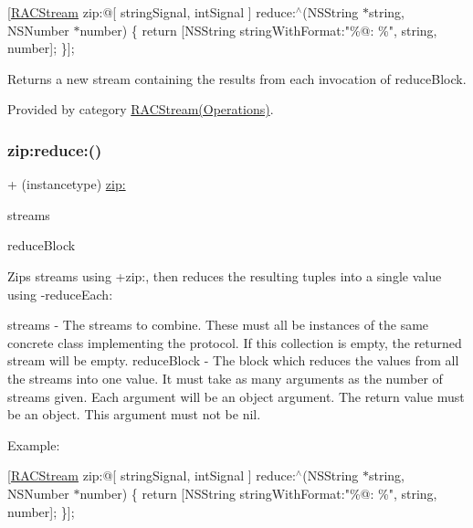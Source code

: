 \mbox{[}\mbox{\hyperlink{interface_r_a_c_stream}{R\+A\+C\+Stream}} zip\+:@\mbox{[} string\+Signal, int\+Signal \mbox{]} reduce\+:$^\wedge$(N\+S\+String $\ast$string, N\+S\+Number $\ast$number) \{ return \mbox{[}N\+S\+String string\+With\+Format\+:"\%@\+: \%", string, number\mbox{]}; \}\mbox{]};

Returns a new stream containing the results from each invocation of {\ttfamily reduce\+Block}. 

Provided by category \mbox{\hyperlink{category_r_a_c_stream_07_operations_08_aba7b1d8c9ac130afad52b0baca8ae016}{R\+A\+C\+Stream(\+Operations)}}.

\mbox{\label{interface_r_a_c_stream_aba7b1d8c9ac130afad52b0baca8ae016}} 
\subsubsection{\texorpdfstring{zip\+:reduce\+:()}{zip:reduce:()}\hspace{0.1cm}{\footnotesize\ttfamily [2/3]}}
{\footnotesize\ttfamily + (instancetype) \mbox{\hyperlink{category_r_a_c_stream_07_operations_08_a90ef5f217dc285dc831cc0d45166a529}{zip\+:}} \begin{DoxyParamCaption}\item[{(id$<$N\+S\+Fast\+Enumeration$>$)}]{streams }\item[{reduce:(id($^\wedge$)())}]{reduce\+Block }\end{DoxyParamCaption}}

Zips streams using +zip\+:, then reduces the resulting tuples into a single value using -\/reduce\+Each\+:

streams -\/ The streams to combine. These must all be instances of the same concrete class implementing the protocol. If this collection is empty, the returned stream will be empty. reduce\+Block -\/ The block which reduces the values from all the streams into one value. It must take as many arguments as the number of streams given. Each argument will be an object argument. The return value must be an object. This argument must not be nil.

Example\+:

\mbox{[}\mbox{\hyperlink{interface_r_a_c_stream}{R\+A\+C\+Stream}} zip\+:@\mbox{[} string\+Signal, int\+Signal \mbox{]} reduce\+:$^\wedge$(N\+S\+String $\ast$string, N\+S\+Number $\ast$number) \{ return \mbox{[}N\+S\+String string\+With\+Format\+:"\%@\+: \%", string, number\mbox{]}; \}\mbox{]};

